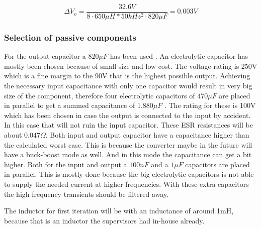 \begin{equation} \label{buckc} 
\Delta V_o = \frac{32.6V}{8\cdot 650\mu H*50kHz^2\cdot 820\mu F} = 0.003V
\end{equation}
   

\subsubsection{Selection of passive components}
For the output capacitor a $820\mu F$ has been used \cite{cout}. An electrolytic capacitor has mostly been chosen because of small size and low cost. The voltage rating is 250V which is a fine margin to the 90V that is the highest possible output.  
Achieving the necessary input capacitance with only one capacitor would result in very big size of the component, therefore four electrolytic capacitors of $470\mu F$ \cite{cin} are placed in parallel to get a summed capacitance of $1.880\mu F$ . The rating for these is 100V which has been chosen in case the output is connected to the input by accident. In this case that will not ruin the input capacitor. These ESR resistances will be about $0.047\Omega$. Both input and output capacitor have a capacitance higher than the calculated worst case. This is because the converter maybe in the future will have a buck-boost mode as well. And in this mode the capacitance can get a bit higher. 
Both for the input and output a $100nF$ and a $1\mu F$  capacitors are placed in parallel. This is mostly done because the big electrolytic capacitors is not able to supply the needed current at higher frequencies. With these extra capacitors the high frequency transients should be filtered away.

The inductor for first iteration  will be with an inductance of around 1mH,  because that is an inductor the supervisors had in-house already.